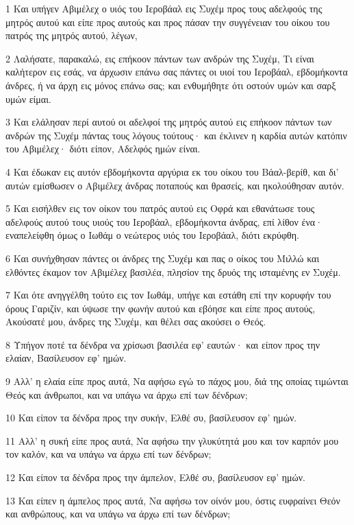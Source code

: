 \par 1 Και υπήγεν Αβιμέλεχ ο υιός του Ιεροβάαλ εις Συχέμ προς τους αδελφούς της μητρός αυτού και είπε προς αυτούς και προς πάσαν την συγγένειαν του οίκου του πατρός της μητρός αυτού, λέγων,
\par 2 Λαλήσατε, παρακαλώ, εις επήκοον πάντων των ανδρών της Συχέμ, Τι είναι καλήτερον εις εσάς, να άρχωσιν επάνω σας πάντες οι υιοί του Ιεροβάαλ, εβδομήκοντα άνδρες, ή να άρχη εις μόνος επάνω σας; και ενθυμήθητε ότι οστούν υμών και σαρξ υμών είμαι.
\par 3 Και ελάλησαν περί αυτού οι αδελφοί της μητρός αυτού εις επήκοον πάντων των ανδρών της Συχέμ πάντας τους λόγους τούτους· και έκλινεν η καρδία αυτών κατόπιν του Αβιμέλεχ· διότι είπον, Αδελφός ημών είναι.
\par 4 Και έδωκαν εις αυτόν εβδομήκοντα αργύρια εκ του οίκου του Βάαλ-βερίθ, και δι' αυτών εμίσθωσεν ο Αβιμέλεχ άνδρας ποταπούς και θρασείς, και ηκολούθησαν αυτόν.
\par 5 Και εισήλθεν εις τον οίκον του πατρός αυτού εις Οφρά και εθανάτωσε τους αδελφούς αυτού τους υιούς του Ιεροβάαλ, εβδομήκοντα άνδρας, επί λίθον ένα· εναπελείφθη όμως ο Ιωθάμ ο νεώτερος υιός του Ιεροβάαλ, διότι εκρύφθη.
\par 6 Και συνήχθησαν πάντες οι άνδρες της Συχέμ και πας ο οίκος του Μιλλώ και ελθόντες έκαμον τον Αβιμέλεχ βασιλέα, πλησίον της δρυός της ισταμένης εν Συχέμ.
\par 7 Και ότε ανηγγέλθη τούτο εις τον Ιωθάμ, υπήγε και εστάθη επί την κορυφήν του όρους Γαριζίν, και ύψωσε την φωνήν αυτού και εβόησε και είπε προς αυτούς, Ακούσατέ μου, άνδρες της Συχέμ, και θέλει σας ακούσει ο Θεός.
\par 8 Υπήγον ποτέ τα δένδρα να χρίσωσι βασιλέα εφ' εαυτών· και είπον προς την ελαίαν, Βασίλευσον εφ' ημών.
\par 9 Αλλ' η ελαία είπε προς αυτά, Να αφήσω εγώ το πάχος μου, διά της οποίας τιμώνται Θεός και άνθρωποι, και να υπάγω να άρχω επί των δένδρων;
\par 10 Και είπον τα δένδρα προς την συκήν, Ελθέ συ, βασίλευσον εφ' ημών.
\par 11 Αλλ' η συκή είπε προς αυτά, Να αφήσω την γλυκύτητά μου και τον καρπόν μου τον καλόν, και να υπάγω να άρχω επί των δένδρων;
\par 12 Και είπον τα δένδρα προς την άμπελον, Ελθέ συ, βασίλευσον εφ' ημών.
\par 13 Και είπεν η άμπελος προς αυτά, Να αφήσω τον οίνόν μου, όστις ευφραίνει Θεόν και ανθρώπους, και να υπάγω να άρχω επί των δένδρων;
